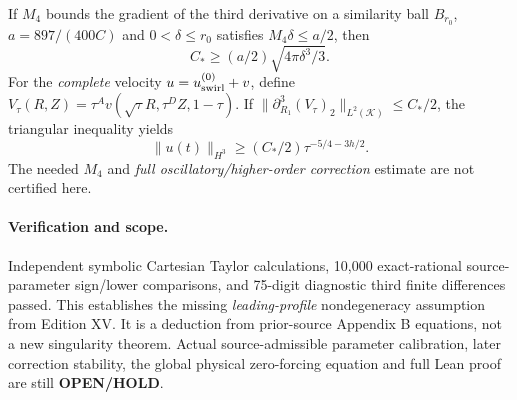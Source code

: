 \begin{corollary}
If $M_4$ bounds the gradient of the third derivative on a similarity ball $B_{r_0}$, $a=897/(400C)$ and $0<\delta\le r_0$ satisfies $M_4\delta\le a/2$, then
\[
C_*\ge(a/2)\sqrt{4\pi\delta^3/3}.
\]
For the \emph{complete} velocity $u=u_{\rm swirl}^{(0)}+v$, define $V_\tau(R,Z)=\tau^A v(\sqrt\tau R,\tau^D Z,1-\tau)$. If
$\|\partial_{R_1}^3(V_\tau)_2\|_{L^2(\mathcal K)}\le C_*/2$,
the triangular inequality yields
\[
\|u(t)\|_{H^3}\ge(C_*/2)\tau^{-5/4-3h/2}.
\]
The needed $M_4$ and \emph{full oscillatory/higher-order correction} estimate are not certified here.
\end{corollary}
\paragraph{Verification and scope.}
Independent symbolic Cartesian Taylor calculations, 10,000 exact-rational source-parameter sign/lower comparisons, and 75-digit diagnostic third finite differences passed. This establishes the missing \emph{leading-profile} nondegeneracy assumption from Edition XV. It is a deduction from prior-source Appendix B equations, not a new singularity theorem. Actual source-admissible parameter calibration, later correction stability, the global physical zero-forcing equation and full Lean proof are still \textbf{OPEN/HOLD}.